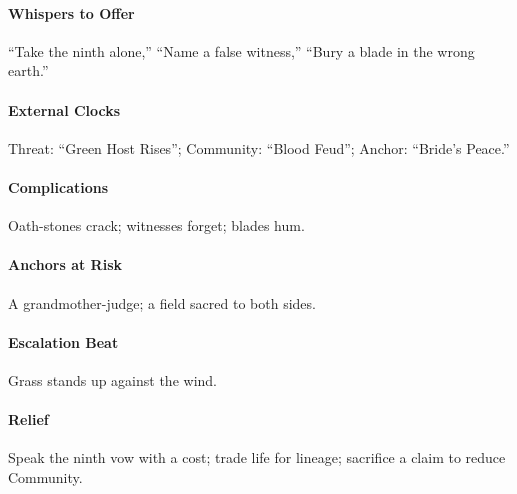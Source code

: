 \paragraph{Whispers to Offer} ``Take the ninth alone,'' ``Name a false witness,'' ``Bury a blade in the wrong earth.''
\paragraph{External Clocks} Threat: ``Green Host Rises''; Community: ``Blood Feud''; Anchor: ``Bride’s Peace.''
\paragraph{Complications} Oath-stones crack; witnesses forget; blades hum.
\paragraph{Anchors at Risk} A grandmother-judge; a field sacred to both sides.
\paragraph{Escalation Beat} Grass stands up against the wind.
\paragraph{Relief} Speak the ninth vow with a cost; trade life for lineage; sacrifice a claim to reduce Community.

